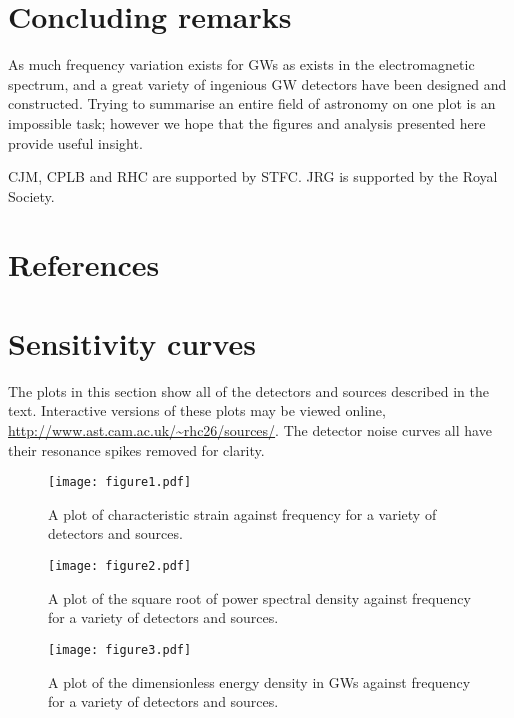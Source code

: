 \documentclass[fleqn,12pt]{iopart}
\begin{document}
\section{Concluding remarks}\label{sec:discussion}
As much frequency variation exists for GWs as exists in the electromagnetic spectrum, and a great variety of ingenious GW detectors have been designed and constructed. Trying to summarise an entire field of astronomy on one plot is an impossible task; however we hope that the figures and analysis presented here provide useful insight.

\ack
CJM, CPLB and RHC are supported by STFC. JRG is supported by the Royal Society.

\section*{References}


\appendix

\section{Sensitivity curves}\label{app:a}

The plots in this section show all of the detectors and sources described in the text. Interactive versions of these plots may be viewed online, \url{http://www.ast.cam.ac.uk/~rhc26/sources/}. The detector noise curves all have their resonance spikes removed for clarity. 
\begin{figure}[h!]
 \centering
 \texttt{[image: figure1.pdf]}
 \caption{A plot of characteristic strain against frequency for a variety of detectors and sources.}
 \label{fig:hc}
\end{figure}
\begin{figure}[h!]
 \centering
 \texttt{[image: figure2.pdf]}
 \caption{A plot of the square root of power spectral density against frequency for a variety of detectors and sources.}
 \label{fig:S}
\end{figure}
\begin{figure}[h!]
 \centering
 \texttt{[image: figure3.pdf]}
 \caption{A plot of the dimensionless energy density in GWs against frequency for a variety of detectors and sources.}
 \label{fig:omega}
\end{figure}
\end{document}

